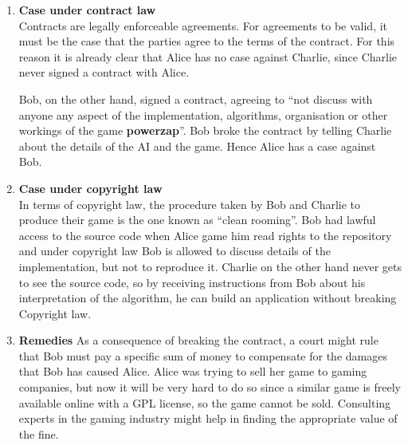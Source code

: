 \documentclass{article}
\renewcommand{\_}{\char`_}
\begin{document}
\begin{enumerate}[label=\textbf{\Alph*}]
\item \textbf{Case under contract law}\\
	Contracts are legally enforceable agreements. For agreements to be valid, it must be the case that the parties agree to the terms of the contract. For this reason it is already clear that Alice has no case against Charlie, since Charlie never signed a contract with Alice. 

	Bob, on the other hand, signed a contract, agreeing to ``not discuss with anyone any aspect of the implementation,
algorithms, organisation or other workings of the game \textbf{powerzap}''. Bob broke the contract by telling Charlie about the details of the AI and the game. Hence Alice has a case against Bob.

\item \textbf{Case under copyright law}\\
In terms of copyright law, the procedure taken by Bob and Charlie to produce their game is the one known as ``clean rooming''. Bob had lawful access to the source code when Alice game him read rights to the repository and under copyright law Bob is allowed to discuss details of the implementation, but not to reproduce it. Charlie on the other hand never gets to see the source code, so by receiving instructions from Bob about his interpretation of the algorithm, he can build an application without breaking Copyright law.

\item \textbf{Remedies}
As a consequence of breaking the contract, a court might rule that Bob must pay a specific sum of money to compensate for the damages that Bob has caused Alice. Alice was trying to sell her game to gaming companies, but now it will be very hard to do so since a similar game is freely available online with a GPL license, so the game cannot be sold. Consulting experts in the gaming industry might help in finding the appropriate value of the fine.

\end{enumerate}

\end{document}
